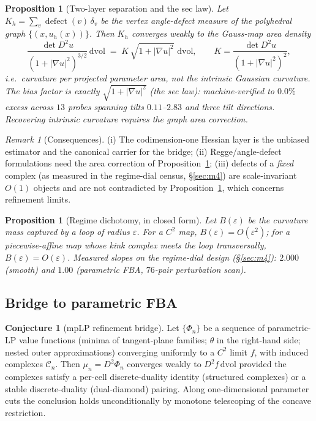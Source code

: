 \documentclass[11pt,a4paper]{article}
\theoremstyle{plain}
\newtheorem{proposition}[theorem]{Proposition}
\theoremstyle{definition}
\newtheorem{conjecture}[theorem]{Conjecture}
\theoremstyle{remark}
\newtheorem{remark}[theorem]{Remark}
\newcommand{\dvol}{\,\mathrm{dvol}}
\begin{document}
\begin{proposition}[Two-layer separation and the sec law]
\label{prop:seclaw}
Let $K_h = \sum_v \operatorname{defect}(v)\,\delta_v$ be the vertex
angle-defect measure of the polyhedral graph
$\{(x, u_h(x))\}$. Then $K_h$ converges weakly to the \emph{Gauss-map area
density}
\[
\frac{\det D^2 u}{\left(1 + |\nabla u|^2\right)^{3/2}} \dvol
\;=\; K\,\sqrt{1+|\nabla u|^2}\,\dvol,
\qquad
K = \frac{\det D^2 u}{(1+|\nabla u|^2)^2},
\]
i.e.\ curvature per projected parameter area, \emph{not} the intrinsic
Gaussian curvature. The bias factor is exactly
$\sqrt{1+|\nabla u|^2}$ (the sec law): machine-verified to $0.0\%$ excess
across $13$ probes spanning tilts $0.11$--$2.83$ and three tilt
directions. Recovering intrinsic curvature requires the graph area
correction.
\end{proposition}

\begin{remark}[Consequences]
(i) The codimension-one Hessian layer is the unbiased estimator and the
canonical carrier for the bridge; (ii) Regge/angle-defect formulations
need the area correction of Proposition~\ref{prop:seclaw}; (iii) defects
of a \emph{fixed} complex (as measured in the regime-dial census, \S\ref{sec:m4}) are
scale-invariant $O(1)$ objects and are not contradicted by
Proposition~\ref{prop:seclaw}, which concerns refinement limits.
\end{remark}

\begin{proposition}[Regime dichotomy, in closed form]
\label{prop:dichotomy}
Let $B(\varepsilon)$ be the curvature mass captured by a loop of radius
$\varepsilon$. For a $C^2$ map, $B(\varepsilon) = O(\varepsilon^2)$; for a
piecewise-affine map whose kink complex meets the loop transversally,
$B(\varepsilon) = O(\varepsilon)$. Measured slopes on the regime-dial design (\S\ref{sec:m4}): $2.000$ (smooth) and $1.00$ (parametric FBA,
$76$-pair perturbation scan).
\end{proposition}

\subsection{Bridge to parametric FBA}

\begin{conjecture}[mpLP refinement bridge]\label{conj:bridge}
Let $\{\Phi_n\}$ be a sequence of parametric-LP value functions (minima of
tangent-plane families; $\theta$ in the right-hand side; nested outer
approximations) converging uniformly to a $C^2$ limit $f$, with induced
complexes $\mathcal{C}_n$. Then $\mu_n = D^2\Phi_n$ converges weakly to
$D^2 f \dvol$ provided the complexes satisfy a per-cell discrete-duality
identity (structured complexes) or a stable discrete-duality
(dual-diamond) pairing. Along one-dimensional parameter cuts the
conclusion holds unconditionally by monotone telescoping of the concave
restriction.
\end{conjecture}
\end{document}
